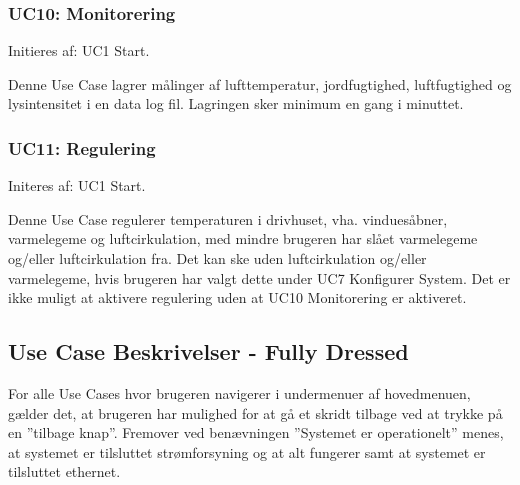 \subsubsection{UC10: Monitorering}
Initieres af: UC1 Start.

Denne Use Case lagrer målinger af lufttemperatur, jordfugtighed, luftfugtighed og lysintensitet i en data log fil. 
Lagringen sker minimum en gang i minuttet. 

\subsubsection{UC11: Regulering}
Initeres af: UC1 Start.

Denne Use Case regulerer temperaturen i drivhuset, vha. vinduesåbner, varmelegeme og luftcirkulation, med mindre brugeren har slået varmelegeme og/eller luftcirkulation fra. 
Det kan ske uden luftcirkulation og/eller varmelegeme, hvis brugeren har valgt dette under UC7 Konfigurer System. Det er ikke muligt at aktivere regulering uden at UC10 Monitorering er aktiveret.

\clearpage

\subsection{Use Case Beskrivelser - Fully Dressed}
For alle Use Cases hvor brugeren navigerer i undermenuer af hovedmenuen, gælder det, at brugeren har mulighed for at gå et skridt tilbage ved at trykke på en ”tilbage knap”. Fremover ved benævningen ”Systemet er operationelt” menes, at systemet er tilsluttet strømforsyning og at alt fungerer samt at systemet er tilsluttet ethernet.

